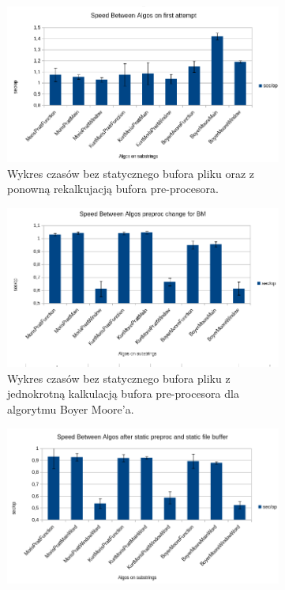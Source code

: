 \begin{figure}
\centering
\begin{subfigure}{0.8\textwidth}
    \includegraphics[width=\textwidth]{./images/GraphFirstAttempt.png}
    \caption{Wykres czasów bez statycznego bufora pliku oraz z ponowną 
    rekalkujacją bufora pre-procesora.}
    \label{fig:GraphFirstAttempt}
\end{subfigure}
\begin{subfigure}{0.8\textwidth}
    \includegraphics[width=\textwidth]{./images/GraphPreAllocBM.png}
    \caption{Wykres czasów bez statycznego bufora pliku z jednokrotną kalkulacją
     bufora pre-procesora dla algorytmu Boyer Moore'a. }
    \label{fig:GraphPreAllocBM}
\end{subfigure}
\begin{subfigure}{0.8\textwidth}
    \includegraphics[width=\textwidth]{./images/GraphStaticPreallocAndFileBuffer.png}

\end{subfigure}
\end{figure}
